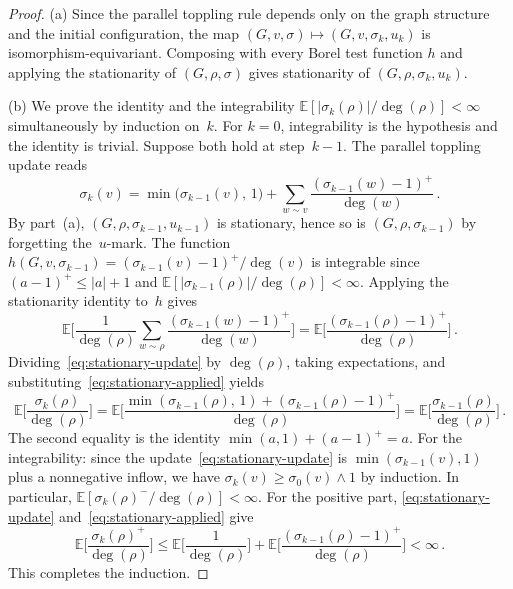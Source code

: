 \documentclass[11pt]{amsart}
\theoremstyle{plain}
\theoremstyle{definition}
\newcommand{\E}{\mathbb{E}}
\begin{document}
	\begin{proof}
		(a) Since the parallel toppling rule depends only on the graph structure and the initial configuration, the map $(G,v,\sigma)\mapsto(G,v,\sigma_k,u_k)$ is isomorphism-equivariant. Composing with every Borel test function $h$ and applying the stationarity of $(G,\rho,\sigma)$ gives stationarity of $(G,\rho,\sigma_k,u_k)$.
		
		\medskip
		
		(b) We prove the identity and the integrability $\E[|\sigma_k(\rho)|/\deg(\rho)]<\infty$ simultaneously by induction on~$k$. For $k=0$, integrability is the hypothesis and the identity is trivial. Suppose both hold at step~$k-1$. The parallel toppling update reads
		\begin{equation}\label{eq:stationary-update}
			\sigma_k(v) = \min\bigl(\sigma_{k-1}(v),\,1\bigr) + \sum_{w \sim v} \frac{(\sigma_{k-1}(w)-1)^+}{\deg(w)}\,.
		\end{equation}
		By part~(a), $(G,\rho,\sigma_{k-1},u_{k-1})$ is stationary, hence so is $(G,\rho,\sigma_{k-1})$ by forgetting the~$u$-mark. The function $h(G,v,\sigma_{k-1}) = (\sigma_{k-1}(v)-1)^+/\deg(v)$ is integrable since $(a-1)^+\leq|a|+1$ and $\E[|\sigma_{k-1}(\rho)|/\deg(\rho)]<\infty$. Applying the stationarity identity to~$h$ gives
		\begin{equation}\label{eq:stationary-applied}
			\E\biggl[\frac{1}{\deg(\rho)}\sum_{w \sim \rho} \frac{(\sigma_{k-1}(w)-1)^+}{\deg(w)}\biggr] = \E\biggl[\frac{(\sigma_{k-1}(\rho)-1)^+}{\deg(\rho)}\biggr]\,.
		\end{equation}
		Dividing~\eqref{eq:stationary-update} by $\deg(\rho)$, taking expectations, and substituting~\eqref{eq:stationary-applied} yields
		\[
		\E\biggl[\frac{\sigma_k(\rho)}{\deg(\rho)}\biggr] = \E\biggl[\frac{\min(\sigma_{k-1}(\rho),\,1) + (\sigma_{k-1}(\rho)-1)^+}{\deg(\rho)}\biggr] = \E\biggl[\frac{\sigma_{k-1}(\rho)}{\deg(\rho)}\biggr]\,.
		\]
		The second equality is the identity $\min(a,1) + (a-1)^+ = a$. For the integrability: since the update~\eqref{eq:stationary-update} is $\min(\sigma_{k-1}(v),1)$ plus a nonnegative inflow, we have $\sigma_k(v) \geq \sigma_0(v) \wedge 1$ by induction. In particular, $\E[\sigma_k(\rho)^-/\deg(\rho)] < \infty$. For the positive part, \eqref{eq:stationary-update} and~\eqref{eq:stationary-applied} give
		\[
		\E\biggl[\frac{\sigma_k(\rho)^+}{\deg(\rho)}\biggr] \leq \E\biggl[\frac{1}{\deg(\rho)}\biggr] + \E\biggl[\frac{(\sigma_{k-1}(\rho)-1)^+}{\deg(\rho)}\biggr] < \infty\,.
		\]
		This completes the induction.
	\end{proof}
	
\end{document}
